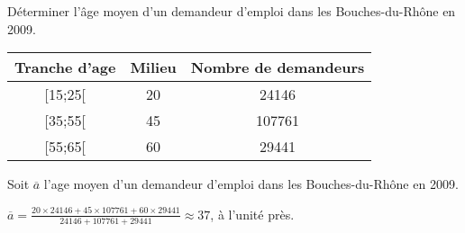 
Déterminer l’âge moyen d’un demandeur d’emploi dans les Bouches-du-Rhône en 2009.

\begin{tabular}{|c|c|c|}
\hline 
Tranche d'age & Milieu & Nombre de demandeurs  \\ 
\hline 
[15;25[ & 20 &24146\\ 
\hline 
[35;55[ & 45 &107761  \\ 
\hline 
[55;65[ & 60 &29441  \\ 
\hline  
\end{tabular} 

\vspace{0.5cm}

Soit $\overline{a}$ l'age moyen d’un demandeur d’emploi dans les Bouches-du-Rhône en 2009.

\vspace{0.5cm}

$\overline{a} = \frac{20 \times  24146 +45 \times  107761 + 60 \times 29441}{ 24146 +  107761 +  29441} \approx 37$, à l'unité près. 